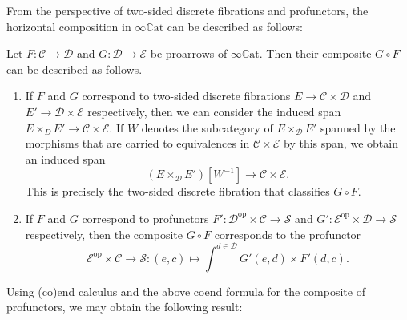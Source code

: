 \documentclass[a4paper, 11pt]{amsart}
\numberwithin{theorem}{section}
\theoremstyle{definition}
\newcommand{\op}{\mathrm{op}}
\renewcommand{\S}{\mathscr{S}}
\newcommand{\C}{\mathscr{C}}
\renewcommand{\D}{\mathscr{D}}
\newcommand{\E}{\mathscr{E}}
\newcommand{\CCAT}{\mathbb{C}\mathrm{at}}
\begin{document}
From the perspective of two-sided discrete fibrations and profunctors, the horizontal composition in $\infty\CCAT$ can be described as follows:

\begin{proposition}\label{prop.ccat-hor-composition}
	Let $F : \C \rightarrow \D$ and $G : \D \rightarrow \E$ be proarrows of $\infty\CCAT$. 
	Then their composite $G\circ F$ can be described as follows.
	\begin{enumerate}
		\item If $F$ and $G$ correspond to two-sided discrete fibrations $E \rightarrow \C \times \D$ and $ E' \rightarrow \D \times \E$ respectively, 
		then we can consider the induced span  
		$
		E \times_D E' \rightarrow \C \times \E.
		$
		If $W$ denotes the subcategory of $E \times_\D E'$ spanned by the morphisms that are carried to equivalences in $\C \times \E$ by this span, 
		we obtain an induced span 
	$$( E \times_\D E')[W^{-1}] \rightarrow  \C \times \E.$$ 
	This is precisely the two-sided discrete fibration that classifies $G\circ F$.
		\item If $F$ and $G$ correspond to profunctors $F' : \D^\op \times \C \rightarrow \S$ and $G' : \E^\op \times \D \rightarrow \S$ respectively, then 
		the composite $G\circ F$ corresponds to the profunctor
		$$
		\E^\op \times \C \rightarrow \S : (e,c) \mapsto \int^{d \in \D} G'(e,d) \times F'(d,c).
		$$
	\end{enumerate}
\end{proposition}

Using (co)end calculus and the above coend formula for the composite of profunctors, we may obtain the following result:
\end{document}
